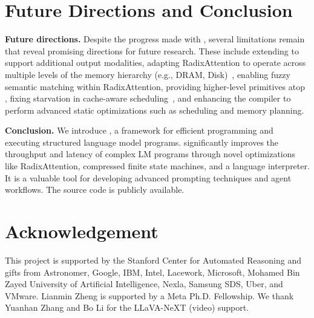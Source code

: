 \section{Future Directions and Conclusion }
\label{sec:conclusion}

\textbf{Future directions.}
Despite the progress made with \lang, several limitations remain that reveal promising directions for future research. These include extending \lang to support additional output modalities, adapting RadixAttention to operate across multiple levels of the memory hierarchy (e.g., DRAM, Disk)~\cite{sheng2023flexgen}, enabling fuzzy semantic matching within RadixAttention, providing higher-level primitives atop \lang,
fixing starvation in cache-aware scheduling~\cite{sheng2023fairness},
and enhancing the \lang compiler to perform advanced static optimizations such as scheduling and memory planning.

\textbf{Conclusion.}
We introduce \lang, a framework for efficient programming and executing structured language model programs. \lang significantly improves the throughput and latency of complex LM programs through novel optimizations like RadixAttention, compressed finite state machines, and a language interpreter. It is a valuable tool for developing advanced prompting techniques and agent workflows. The source code is publicly available.


\section*{Acknowledgement}
This project is supported by the Stanford Center for Automated Reasoning and gifts from Astronomer, Google, IBM, Intel, Lacework, Microsoft, Mohamed Bin Zayed University of Artificial Intelligence, Nexla, Samsung SDS, Uber, and VMware.
Lianmin Zheng is supported by a Meta Ph.D. Fellowship.
We thank Yuanhan Zhang and Bo Li for the LLaVA-NeXT (video) support.